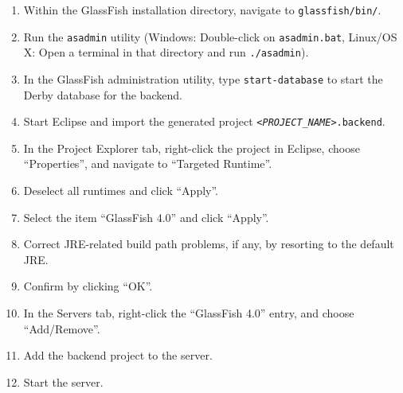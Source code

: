 \begin{enumerate}
\item Within the GlassFish installation directory, navigate to \texttt{glassfish/bin/}.
\item Run the \texttt{asadmin} utility (Windows: Double-click on \texttt{asadmin.bat}, Linux/OS X: Open a terminal in that directory and run \texttt{./asadmin}).
\item In the GlassFish administration utility, type \texttt{start-database} to start the Derby database for the backend.
\item Start Eclipse and import the generated project \texttt{\textit{<PROJECT\_NAME>}.backend}.
\item In the Project Explorer tab, right-click the project in Eclipse, choose \enquote{Properties}, and navigate to \enquote{Targeted Runtime}.
\item Deselect all runtimes and click \enquote{Apply}.
\item Select the item \enquote{GlassFish 4.0} and click \enquote{Apply}.
\item Correct JRE-related build path problems, if any, by resorting to the default JRE.
\item Confirm by clicking \enquote{OK}.
\item In the Servers tab, right-click the \enquote{GlassFish 4.0} entry, and choose \enquote{Add/Remove}.
\item Add the backend project to the server.
\item Start the server.
\end{enumerate}